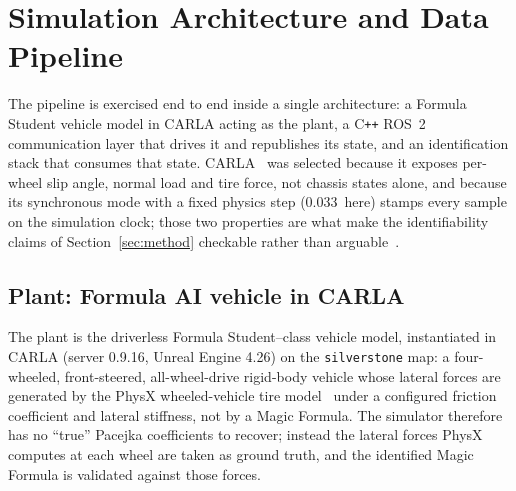 \documentclass[lineno,12pt]{sn-jnl}
\makeatletter
\newif\ifsiu@prev
\DeclareRobustCommand{\siu@sep}{\ifsiu@prev\,\fi}
\DeclareRobustCommand{\siu@unit}[1]{\siu@sep\text{#1}\siu@prevtrue}
\DeclareRobustCommand{\siu@pre}[1]{\siu@sep\text{#1}\siu@prevfalse}
\DeclareRobustCommand{\siu@div}[1]{\text{#1}\siu@prevfalse}
\DeclareRobustCommand{\meter}{m}
\DeclareRobustCommand{\second}{s}
\DeclareRobustCommand{\gram}{g}
\DeclareRobustCommand{\newton}{N}
\DeclareRobustCommand{\radian}{rad}
\DeclareRobustCommand{\hertz}{Hz}
\DeclareRobustCommand{\percent}{\%}
\DeclareRobustCommand{\g}{\textit{g}}
\DeclareRobustCommand{\kilo}{k}
\DeclareRobustCommand{\milli}{m}
\DeclareRobustCommand{\per}{/}
\DeclareRobustCommand{\squared}{\ensuremath{^{2}}}
\providecommand{\degree}{\ensuremath{^{\circ}}}
\DeclareRobustCommand{\si}[1]{\begingroup
  \siu@prevfalse
  \renewcommand{\meter}{\siu@unit{m}}%
  \renewcommand{\second}{\siu@unit{s}}%
  \renewcommand{\gram}{\siu@unit{g}}%
  \renewcommand{\newton}{\siu@unit{N}}%
  \renewcommand{\radian}{\siu@unit{rad}}%
  \renewcommand{\hertz}{\siu@unit{Hz}}%
  \renewcommand{\percent}{\siu@unit{\%}}%
  \renewcommand{\degree}{\siu@unit{\ensuremath{^{\circ}}}}%
  \renewcommand{\g}{\siu@unit{\textit{g}}}%
  \renewcommand{\kilo}{\siu@pre{k}}%
  \renewcommand{\milli}{\siu@pre{m}}%
  \renewcommand{\per}{\siu@div{/}}%
  \renewcommand{\squared}{\ensuremath{^{2}}}%
  #1\endgroup}
\DeclareRobustCommand{\SI}[2]{#1\,\si{#2}}
\theoremstyle{thmstyleone}%
\theoremstyle{thmstyletwo}%
\theoremstyle{thmstylethree}%
\makeatother
\begin{document}
\section{Simulation Architecture and Data Pipeline}
\label{sec:platform}

The pipeline is exercised end to end inside a single architecture: a Formula
Student vehicle model in CARLA acting as the plant, a C\texttt{++} ROS~2
communication layer that drives it and republishes its state, and an
identification stack that consumes that state. CARLA~\cite{carla2017} was
selected because it exposes per-wheel slip angle, normal load and tire force,
not chassis states alone, and because its synchronous mode with a fixed
physics step (\SI{0.033}{\second} here) stamps every sample on the simulation
clock; those two properties are what make the identifiability claims of
Section~\ref{sec:method} checkable rather than
arguable~\cite{kaur2021simsurvey}.

\subsection{Plant: Formula AI vehicle in CARLA}
\label{subsec:platform}

The plant is the driverless Formula Student--class vehicle model, instantiated
in CARLA (server 0.9.16, Unreal Engine 4.26) on the \texttt{silverstone} map: a
four-wheeled, front-steered, all-wheel-drive rigid-body vehicle whose lateral
forces are generated by the PhysX wheeled-vehicle tire
model~\cite{physxvehicle} under a configured friction coefficient and lateral
stiffness, not by a Magic Formula. The simulator therefore has no ``true''
Pacejka coefficients to recover; instead the lateral forces PhysX computes at
each wheel are taken as ground truth, and the identified Magic Formula is
validated against those forces.
\end{document}
